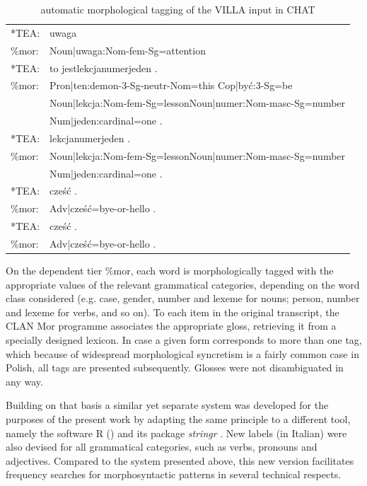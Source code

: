 \begin{table}
    \begin{tabular}{ll}
        *TEA:   & uwaga\\
        \%mor:  & Noun|uwaga:Nom-fem-Sg=attention\\
        *TEA:   & to jestlekcjanumerjeden . \\
        \%mor:  & Pron|ten:demon-3-Sg-neutr-Nom=this Cop|być:3-Sg=be \\
        ~       & Noun|lekcja:Nom-fem-Sg=lessonNoun|numer:Nom-masc-Sg=number\\
        ~       & Num|jeden:cardinal=one . \\
        *TEA:   & lekcjanumerjeden .  \\
        \%mor:  & Noun|lekcja:Nom-fem-Sg=lessonNoun|numer:Nom-masc-Sg=number\\
        ~       & Num|jeden:cardinal=one . \\
        *TEA:   & cześć .  \\
        \%mor:  & Adv|cześć=bye-or-hello . \\
        *TEA:   & cześć .  \\
        \%mor:  & Adv|cześć=bye-or-hello . \\
    \end{tabular}
    \caption{automatic morphological tagging of the VILLA input in CHAT}
    \label{fig:02:5}
\end{table}

On the dependent tier \%mor, each word is morphologically tagged with the appropriate values of the relevant grammatical categories, depending on the word class considered (e.g. case, gender, number and lexeme for nouns; person, number and lexeme for verbs, and so on). To each item in the original transcript, the CLAN Mor programme associates the appropriate gloss, retrieving it from a specially designed lexicon. In case a given form corresponds to more than one tag, which because of widespread morphological syncretism is a fairly common case in Polish, all tags are presented subsequently. Glosses were not disambiguated in any way.

Building on that basis  a similar yet separate system was developed for the purposes of the present work by adapting the same principle to a different tool, namely the software R (\citealt{RCoreTeam2017}) and its package \textit{stringr} \citep{Wickham2017}. New labels (in Italian) were also devised for all grammatical categories, such as verbs, pronouns and adjectives. Compared to the system presented above, this new version facilitates frequency searches for morphosyntactic patterns in several technical respects.

